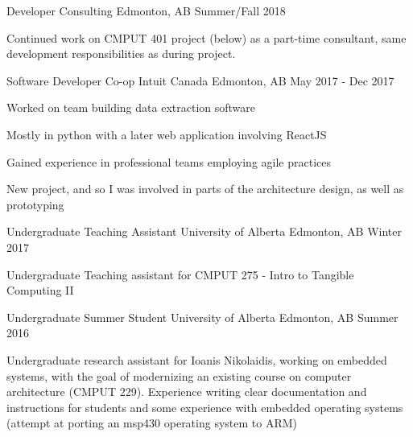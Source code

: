 
\begin{cventries}
  \cventry
    {Developer} %
    {Consulting} %
    {Edmonton, AB} %
    {Summer/Fall 2018} %
    {
      \begin{cvitems} %
      \item {Continued work on CMPUT 401 project (below) as a part-time consultant, same development responsibilities as during project.}
      \end{cvitems}
    }

  \cventry
    {Software Developer Co-op} %
    {Intuit Canada} %
    {Edmonton, AB} %
    {May 2017 - Dec 2017} %
    {
      \begin{cvitems} %
      \item {Worked on team building data extraction software}
      \item {Mostly in python with a later web application involving ReactJS}
      \item {Gained experience in professional teams employing agile practices}
      \item {New project, and so I was involved in parts of the architecture design, as well as prototyping}
      \end{cvitems}
    }

  \cventry
    {Undergraduate Teaching Assistant} %
    {University of Alberta} %
    {Edmonton, AB} %
    {Winter 2017} %
    {
      \begin{cvitems} %
      \item {Undergraduate Teaching assistant for CMPUT 275 - Intro to Tangible Computing II}
      \end{cvitems}
    }

  \cventry
    {Undergraduate Summer Student} %
    {University of Alberta} %
    {Edmonton, AB} %
    {Summer 2016} %
    {
      \begin{cvitems} %
      \item {Undergraduate research assistant for Ioanis Nikolaidis, working on embedded systems, with the goal of modernizing an existing course on computer architecture (CMPUT 229). Experience writing clear documentation and instructions for students and some experience with embedded operating systems (attempt at porting an msp430 operating system to ARM)}
      \end{cvitems}
    }


\end{cventries}
